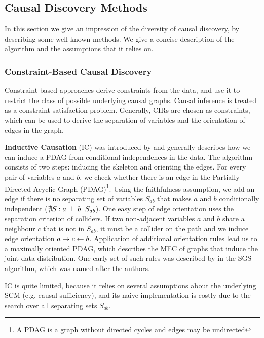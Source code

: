 \subsection{Causal Discovery Methods}

In this section we give an impression of the diversity of causal discovery, by describing some well-known methods. We give a concise description of the algorithm and the assumptions that it relies on.

\subsubsection{Constraint-Based Causal Discovery}
Constraint-based approaches derive constraints from the data, and use it to restrict the class of possible underlying causal graphs. Causal inference is treated as a constraint-satisfaction problem. Generally, CIRs are chosen as constraints, which can be used to derive the separation of variables and the orientation of edges in the graph. 

\textbf{Inductive Causation} (IC) was introduced by \citet{verma1991equivalence} and generally describes how we can induce a PDAG from conditional independences in the data. The algorithm consists of two steps: inducing the skeleton and orienting the edges. For every pair of variables $a$ and $b$, we check whether there is an edge in the Partially Directed Acyclic Graph (PDAG)\footnote{A PDAG is a graph without directed cycles and edges may be undirected}. Using the faithfulness assumption, we add an edge if there is no separating set of variables $S_{ab}$ that makes $a$ and $b$ conditionally independent ($\nexists S : {a} \operatorname*{{\,\perp\mkern-12mu\perp\,}}_{} {b} \,|\, {S_{ab}}$). One easy step of edge orientation uses the separation criterion of colliders. If two non-adjacent variables $a$ and $b$ share a neighbour $c$ that is not in $S_{ab}$, it must be a collider on the path and we induce edge orientation $a\to c \leftarrow b$. Application of additional orientation rules lead us to a maximally oriented PDAG, which describes the MEC of graphs that induce the joint data distribution. One early set of such rules was described by \citet{spirtes2000causation} in the SGS algorithm, which was named after the authors.
            
IC is quite limited, because it relies on several assumptions about the underlying SCM (e.g. causal sufficiency), and its naive implementation is costly due to the search over all separating sets $S_{ab}$.

